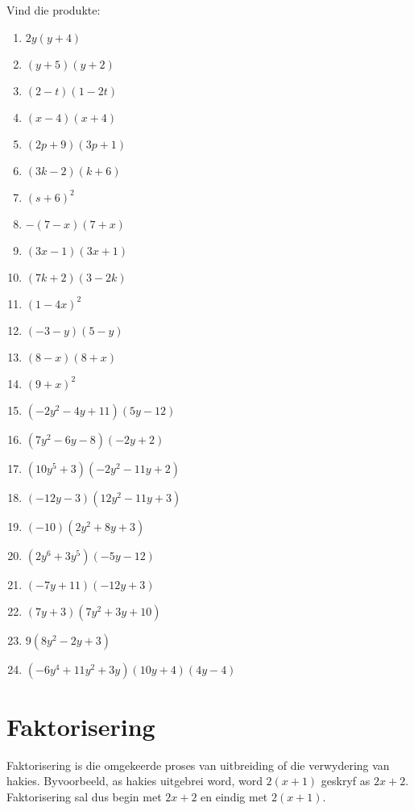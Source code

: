 \begin{exercises}{}
{
Vind die produkte:

\begin{multicols}{2}
\begin{enumerate}[label=\textbf{\arabic*}., itemsep=5pt]
\item $2y(y+4)$ 
\item $(y+5)(y+2) $
\item $(2-t)(1-2t)$
\item $(x-4)(x+4)$
\item $ (2p+9)(3p+1)$
\item $(3k-2)(k+6)$
\item $(s+6)^2$
\item $-(7-x)(7+x)$
\item $(3x-1)(3x+1)$
\item $(7k+2)(3-2k)$
\item $(1-4x)^2$
\item $(-3-y)(5-y)$
\item $(8-x)(8+x)$
\item $(9+x)^2$
\item$(-2{y}^{2}-4y+11)(5y-12)$ 
\item$(7{y}^{2}-6y-8)(-2y+2)$%
\item$(10{y}^{5}+3)(-2{y}^{2}-11y+2)$ 
\item$(-12y-3)(12{y}^{2}-11y+3)$%
\item$(-10)(2{y}^{2}+8y+3)$ 
\item$(2{y}^{6}+3{y}^{5})(-5y-12)$%
\item$(-7y+11)(-12y+3)$%
\item$(7y+3)(7{y}^{2}+3y+10)$%
\item$9(8{y}^{2}-2y+3)$ 
\item$(-6{y}^{4}+11{y}^{2}+3y)(10y+4)(4y-4)$ 
\end{enumerate}
\end{multicols}

}
\end{exercises}





\section{Faktorisering}

Faktorisering is die omgekeerde proses van uitbreiding of die verwydering van hakies. Byvoorbeeld, as hakies uitgebrei word,
word $2(x+1)$ geskryf as $2x+2$. Faktorisering sal dus begin met $2x+2$ en eindig met $2(x+1)$. 

